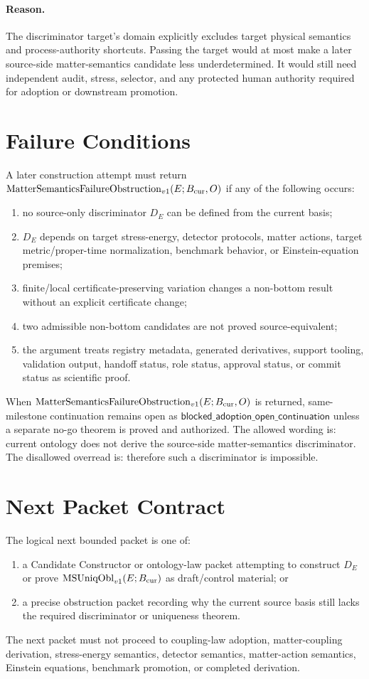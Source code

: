 \paragraph{Reason.}
The discriminator target's domain explicitly excludes target physical
semantics and process-authority shortcuts.  Passing the target would at most
make a later source-side matter-semantics candidate less underdetermined.  It
would still need independent audit, stress, selector, and any protected human
authority required for adoption or downstream promotion.

\section{Failure Conditions}

A later construction attempt must return \(\mathrm{MatterSemanticsFailureObstruction}_{v1}(E;B_{\mathrm{cur}},O)\) if any of the
following occurs:
\begin{enumerate}
  \item no source-only discriminator \(D_E\) can be defined from the current
    basis;
  \item \(D_E\) depends on target stress-energy, detector protocols, matter
    actions, target metric/proper-time normalization, benchmark behavior, or
    Einstein-equation premises;
  \item finite/local certificate-preserving variation changes a non-bottom
    result without an explicit certificate change;
  \item two admissible non-bottom candidates are not proved source-equivalent;
  \item the argument treats registry metadata, generated derivatives, support
    tooling, validation output, handoff status, role status, approval status,
    or commit status as scientific proof.
\end{enumerate}

When \(\mathrm{MatterSemanticsFailureObstruction}_{v1}(E;B_{\mathrm{cur}},O)\) is returned, same-milestone continuation remains
open as \(\mathsf{blocked\_adoption\_open\_continuation}\) unless a separate
no-go theorem is proved and authorized.  The allowed wording is: current
ontology does not derive the source-side matter-semantics discriminator.  The
disallowed overread is: therefore such a discriminator is impossible.

\section{Next Packet Contract}

The logical next bounded packet is one of:
\begin{enumerate}
  \item a Candidate Constructor or ontology-law packet attempting to construct
    \(D_E\) or prove \(\mathrm{MSUniqObl}_{v1}(E;B_{\mathrm{cur}})\) as draft/control material; or
  \item a precise obstruction packet recording why the current source basis
    still lacks the required discriminator or uniqueness theorem.
\end{enumerate}
The next packet must not proceed to coupling-law adoption, matter-coupling
derivation, stress-energy semantics, detector semantics, matter-action
semantics, Einstein equations, benchmark promotion, or completed derivation.

